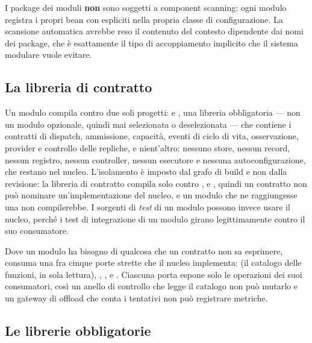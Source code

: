 I package dei moduli \textbf{non} sono soggetti a component scanning: ogni
modulo registra i propri bean con  espliciti nella propria classe
di configurazione. La scansione automatica avrebbe reso il contenuto del
contesto dipendente dai nomi dei package, che \`e esattamente il tipo di
accoppiamento implicito che il sistema modulare vuole evitare.

\subsection{La libreria di contratto}

Un modulo compila contro due soli progetti:  e
, una libreria obbligatoria --- non un modulo
opzionale, quindi mai selezionata o deselezionata --- che contiene i contratti
di dispatch, ammissione, capacit\`a, eventi di ciclo di vita, osservazione,
provider e controllo delle repliche, e nient'altro: nessuno store, nessun
record, nessun registro, nessun controller, nessun esecutore e nessuna
autoconfigurazione, che restano nel nucleo. L'isolamento \`e imposto dal grafo di
build e non dalla revisione: la libreria di contratto compila solo contro
,  e , quindi un contratto non
pu\`o nominare un'implementazione del nucleo, e un modulo che ne raggiungesse
una non compilerebbe. I sorgenti di \emph{test} di un modulo possono invece
usare il nucleo, perch\'e i test di integrazione di un modulo girano
legittimamente contro il suo consumatore.

Dove un modulo ha bisogno di qualcosa che un contratto non sa esprimere, consuma
una fra cinque porte strette che il nucleo implementa:
 (il catalogo delle funzioni, in sola lettura),
, ,
 e . Ciascuna porta espone solo
le operazioni dei suoi consumatori, cos\`i un anello di controllo che legge il
catalogo non pu\`o mutarlo e un gateway di offload che conta i tentativi non pu\`o
registrare metriche.

\subsection{Le librerie obbligatorie}

